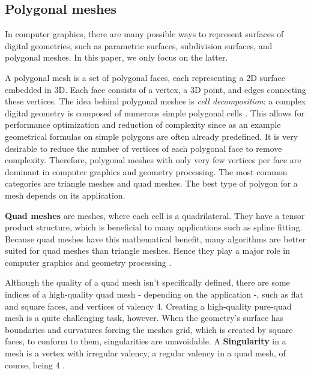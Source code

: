 \documentclass{ACGSeminar}
\begin{document}
\subsection{Polygonal meshes}
In computer graphics, there are many possible ways to represent surfaces of digital geometries, such as parametric surfaces, subdivision surfaces, and polygonal meshes. In this paper, we only focus on the latter.\bigskip

A polygonal mesh is a set of polygonal faces, each representing a 2D surface embedded in 3D. Each face consists of a vertex, a 3D point, and edges connecting these vertices. The idea behind polygonal meshes is \textit{cell decomposition}: a complex digital geometry is composed of numerous simple polygonal cells \cite{bommes2013quad}. This allows for performance optimization and reduction of complexity since as an example geometrical formulas on simple polygons are often already predefined. It is very desirable to reduce the number of vertices of each polygonal face to remove complexity. Therefore, polygonal meshes with only very few vertices per face are dominant in computer graphics and geometry processing. The most common categories are triangle meshes and quad meshes. The best type of polygon for a mesh depends on its application.\bigskip

\textbf{Quad meshes} are meshes, where each cell is a quadrilateral. They have a tensor product structure, which is beneficial to many applications such as spline fitting. Because quad meshes have this mathematical benefit, many algorithms are better suited for quad meshes than triangle meshes. Hence they play a major role in computer graphics and geometry processing \cite{bommes2013quad, chen2019quadrilateral}.

Although the quality of a quad mesh isn't specifically defined, there are some indices of a high-quality quad mesh - depending on the application -, such as flat and square faces, and vertices of valency 4. Creating a high-quality pure-quad mesh is a quite challenging task, however. When the geometry's surface has boundaries and curvatures forcing the meshes grid, which is created by square faces, to conform to them, singularities are unavoidable. A \textbf{Singularity} in a mesh is a vertex with irregular valency, a regular valency in a quad mesh, of course, being 4 \cite{fogg2017simple,fogg2018singularities}.
\end{document}
